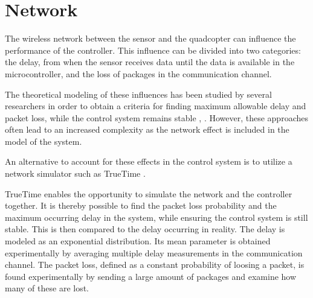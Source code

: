 \section{Network}
The wireless network between the sensor and the quadcopter can influence the performance of the controller. This influence can be divided into two categories: the delay, from when the sensor receives data until the data is available in the microcontroller, and the loss of packages in the communication channel.


The theoretical modeling of these influences has been studied by several researchers in order to obtain a criteria for finding maximum allowable delay and packet loss, while the control system remains stable  \cite{ling}, \cite{nirupam}. However, these approaches often lead to an increased complexity as the network effect is included in the model of the system.

An alternative to account for these effects in the control system is to utilize a network simulator such as TrueTime \cite{TrueTimeNew}.

TrueTime enables the opportunity to simulate the network and the controller together. It is thereby possible to find the packet loss probability and the maximum occurring delay in the system, while ensuring the control system is still stable. This is then compared to the delay occurring in reality. The delay is modeled as an exponential distribution. Its mean parameter is obtained experimentally by averaging multiple delay measurements in the communication channel. The packet loss, defined as a constant probability of loosing a packet, is found experimentally by sending a large amount of packages and examine how many of these are lost.  

